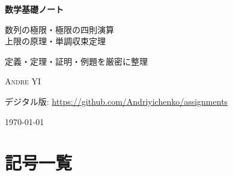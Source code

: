 \documentclass[11pt,a4paper]{jsarticle}
\theoremstyle{definition}
\begin{document}
\begin{titlepage}
  \centering
  \vspace*{2.5cm}

  {\fontsize{32}{38}\selectfont\bfseries\color{titleblue} 数学基礎ノート\par}

  \vspace{1.2cm}

  {\LARGE\color{titleblue!85}
    数列の極限・極限の四則演算\\[0.4cm]
    上限の原理・単調収束定理\par
  }

  \vspace{2cm}

  \begin{tcolorbox}[
    colback=defblue,
    colframe=defborder,
    width=0.82\textwidth,
    arc=3pt,
    boxrule=0.5pt
  ]
    \centering\large
    定義・定理・証明・例題を厳密に整理\\[0.3cm]
  \end{tcolorbox}

  \vfill

  {\Large\textsc{Andre YI}\par}
  \vspace{0.4cm}
  {\large デジタル版: \url{https://github.com/Andriyichenko/assignments}\par}
  \vspace{0.8cm}
  {\large \today\par}
\end{titlepage}

\tableofcontents
\newpage

\section*{記号一覧}
\end{document}
